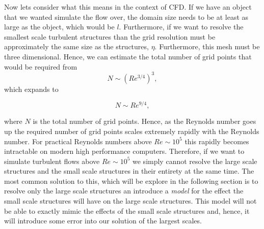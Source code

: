 Now lets consider what this means in the context of CFD. If we have an object that we wanted simulate the flow over, the domain size needs to be at least as large as the object, which would be $l$. Furthermore, if we want to resolve the smallest scale turbulent structures than the grid resolution must be approximately the same size as the structures, $\eta$. Furthermore, this mesh must be three dimensional. Hence, we can estimate the total number of grid points that would be required from
\begin{equation}
	N \sim \left(Re^{3/4}\right)^3,
\end{equation}
which expands to
\begin{eqBox}
\begin{equation}
	N \sim Re^{9/4},
\end{equation}
\end{eqBox}
where $N$ is the total number of grid points. Hence, as the Reynolds number goes up the required number of grid points scales extremely rapidly with the Reynolds number. For practical Reynolds numbers above $Re \sim 10^5$ this rapidly becomes intractable on modern high performance computers. Therefore, if we want to simulate turbulent flows above $Re \sim 10^5$ we simply cannot resolve the large scale structures and the small scale structures in their entirety at the same time. The most common solution to this, which will be explore in the following section is to resolve only the large scale structures an introduce a {\it model} for the effect the small scale structures will have on the large scale structures. This model will not be able to exactly mimic the effects of the small scale structures and, hence, it will introduce some error into our solution of the largest scales.

